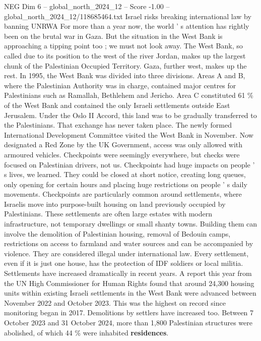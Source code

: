 \begin{textsample}{NEG Dim 6 – global\_north\_2024\_12 – Score -1.00 – global\_north\_2024\_12/118685464.txt}  \label{ex:f6_neg_191}
Israel risks breaking international law by banning UNRWA For more than a year now, the world ' s attention has rightly been on the brutal war in Gaza.
But the situation in the West Bank is approaching a tipping point too ; we must not look away.
The West Bank, so called due to its position to the west of the river Jordan, makes up the largest chunk of the Palestinian Occupied Territory.
Gaza, further west, makes up the rest.
In 1995, the West Bank was divided into three divisions.
Areas A and B, where the Palestinian Authority was in charge, contained major centres for Palestinians such as Ramallah, Bethlehem and Jericho.
Area C constituted 61 \% of the West Bank and contained the only Israeli settlements outside East Jerusalem.
Under the Oslo II Accord, this land was to be gradually transferred to the Palestinians.
That exchange has never taken place.
The newly formed International Development Committee visited the West Bank in November.
Now designated a Red Zone by the UK Government, access was only allowed with armoured vehicles.
Checkpoints were seemingly everywhere, but checks were focused on Palestinian drivers, not us.
Checkpoints had huge impacts on people ' s lives, we learned.
They could be closed at short notice, creating long queues, only opening for certain hours and placing huge restrictions on people ' s daily movements.
Checkpoints are particularly common around settlements, where Israelis move into purpose-built housing on land previously occupied by Palestinians.
These settlements are often large estates with modern infrastructure, not temporary dwellings or small shanty towns.
Building them can involve the demolition of Palestinian housing, removal of Bedouin camps, restrictions on access to farmland and water sources and can be accompanied by violence.
They are considered illegal under international law.
Every settlement, even if it is just one house, has the protection of IDF soldiers or local militia.
Settlements have increased dramatically in recent years.
A report this year from the UN High Commissioner for Human Rights found that around 24,300 housing units within existing Israeli settlements in the West Bank were advanced between November 2022 and October 2023.
This was the highest on record since monitoring began in 2017.
Demolitions by settlers have increased too.
Between 7 October 2023 and 31 October 2024, more than 1,800 Palestinian structures were abolished, of which 44 \% were inhabited \textbf{residences}.

\end{textsample}
